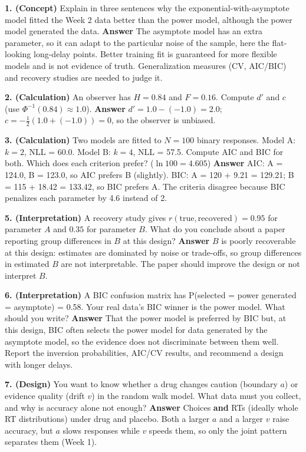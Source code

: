 \textbf{1. (Concept)} Explain in three sentences why the
exponential-with-asymptote model fitted the Week 2 data better than the
power model, although the power model generated the data.
\textbf{Answer} The asymptote model has an extra parameter, so it can
adapt to the particular noise of the sample, here the flat-looking
long-delay points. Better training fit is guaranteed for more flexible
models and is not evidence of truth. Generalization measures (CV,
AIC/BIC) and recovery studies are needed to judge it.

\textbf{2. (Calculation)} An observer has \(H = 0.84\) and \(F = 0.16\).
Compute \(d'\) and \(c\) (use \(\Phi^{-1}(0.84) \approx 1.0\)).
\textbf{Answer} \(d' = 1.0 - (-1.0) = 2.0\);
\(c = -\tfrac12(1.0 + (-1.0)) = 0\), so the observer is unbiased.

\textbf{3. (Calculation)} Two models are fitted to \(N = 100\) binary
responses. Model A: \(k = 2\), NLL = 60.0. Model B: \(k = 4\), NLL =
57.5. Compute AIC and BIC for both. Which does each criterion prefer?
(\(\ln 100 = 4.605\)) \textbf{Answer} AIC: A = 124.0, B = 123.0, so AIC
prefers B (slightly). BIC: A = 120 + 9.21 = 129.21; B = 115 + 18.42 =
133.42, so BIC prefers A. The criteria disagree because BIC penalizes
each parameter by 4.6 instead of 2.

\textbf{5. (Interpretation)} A recovery study gives
\(r(\text{true}, \text{recovered}) = 0.95\) for parameter \(A\) and
\(0.35\) for parameter \(B\). What do you conclude about a paper
reporting group differences in \(B\) at this design? \textbf{Answer}
\(B\) is poorly recoverable at this design: estimates are dominated by
noise or trade-offs, so group differences in estimated \(B\) are not
interpretable. The paper should improve the design or not interpret
\(B\).

\textbf{6. (Interpretation)} A BIC confusion matrix has P(selected =
power \textbar{} generated = asymptote) = 0.58. Your real data's BIC
winner is the power model. What should you write? \textbf{Answer} That
the power model is preferred by BIC but, at this design, BIC often
selects the power model for data generated by the asymptote model, so
the evidence does not discriminate between them well. Report the
inversion probabilities, AIC/CV results, and recommend a design with
longer delays.

\textbf{7. (Design)} You want to know whether a drug changes caution
(boundary \(a\)) or evidence quality (drift \(v\)) in the random walk
model. What data must you collect, and why is accuracy alone not enough?
\textbf{Answer} Choices \textbf{and} RTs (ideally whole RT
distributions) under drug and placebo. Both a larger \(a\) and a larger
\(v\) raise accuracy, but \(a\) slows responses while \(v\) speeds them,
so only the joint pattern separates them (Week 1).

